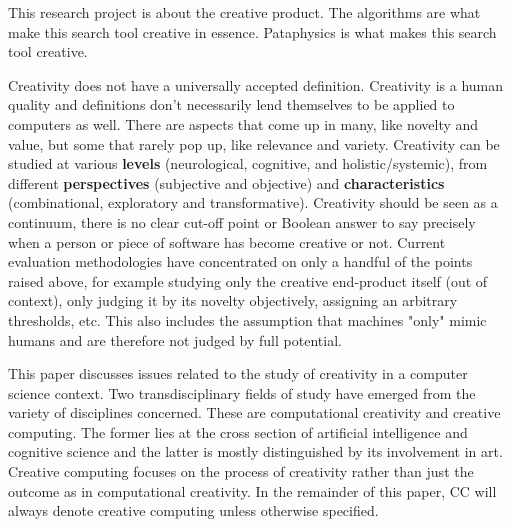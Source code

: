 This research project is about the creative product. The algorithms are what make this search tool creative in essence. Pataphysics is what makes this search tool creative.








Creativity does not have a universally accepted definition. Creativity is a human quality and definitions don’t necessarily lend themselves to be applied to computers as well. There are aspects that come up in many, like novelty and value, but some that rarely pop up, like relevance and variety. Creativity can be studied at various \textbf{levels} (neurological, cognitive, and holistic/systemic), from different \textbf{perspectives} (subjective and objective) and \textbf{characteristics} (combinational, exploratory and transformative). Creativity should be seen as a continuum, there is no clear cut-off point or Boolean answer to say precisely when a person or piece of software has become creative or not.
Current evaluation methodologies have concentrated on only a handful of the points raised above, for example studying only the creative end-product itself (out of context), only judging it by its novelty objectively, assigning an arbitrary thresholds, etc. This also includes the assumption that machines "only" mimic humans and are therefore not judged by full potential.

This paper discusses issues related to the study of creativity in a computer science context. Two transdisciplinary fields of study have emerged from the variety of disciplines concerned. These are computational creativity and creative computing. The former lies at the cross section of artificial intelligence and cognitive science and the latter is mostly distinguished by its involvement in art. Creative computing focuses on the process of creativity rather than just the outcome as in computational creativity. In the remainder of this paper, CC will always denote creative computing unless otherwise specified.


